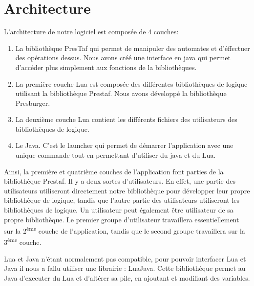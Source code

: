 \section{Architecture}

L'architecture de notre logiciel est composée de 4 couches:
\begin{enumerate}
	\item La bibliothèque PresTaf qui permet de manipuler des automates et d'éffectuer des opérations dessus. Nous avons créé une interface en java qui permet d'accéder plus simplement aux fonctions de la bibliothèques.
	\item La première couche Lua est composée des différentes bibliothèques de logique utilisant la bibliothèque Prestaf. Nous avons développé la bibliothèque Presburger.
	\item La deuxième couche Lua contient les différents fichiers des utilisateurs des bibliothèques de logique.
	\item Le Java. C'est le launcher qui permet de démarrer l'application avec une unique commande tout en permettant d'utiliser du java et du Lua.
\end{enumerate}

Ainsi, la première et quatrième couches de l'application font parties de la bibliothèque Prestaf. Il y a deux sortes d'utilisateurs. En effet, une partie des utilisateurs utiliseront directement notre bibliothèque pour développer leur propre bibliothèque de logique, tandis que l'autre partie des utilisateurs utiliseront les bibliothèques de logique. Un utilisateur peut également être utilisateur de sa propre bibliothèque. Le premier groupe d'utilisateur travaillera essentiellement sur la 2\textsuperscript{ème} couche de l'application, tandis que le second groupe travaillera sur la 3\textsuperscript{ème} couche.\\\par

Lua et Java n'étant normalement pas compatible, pour pouvoir interfacer Lua et Java il nous a fallu utiliser une librairie : LuaJava. Cette bibliothèque permet au Java d'executer du Lua et d'altérer sa pile, en ajoutant et modifiant des variables.\\

